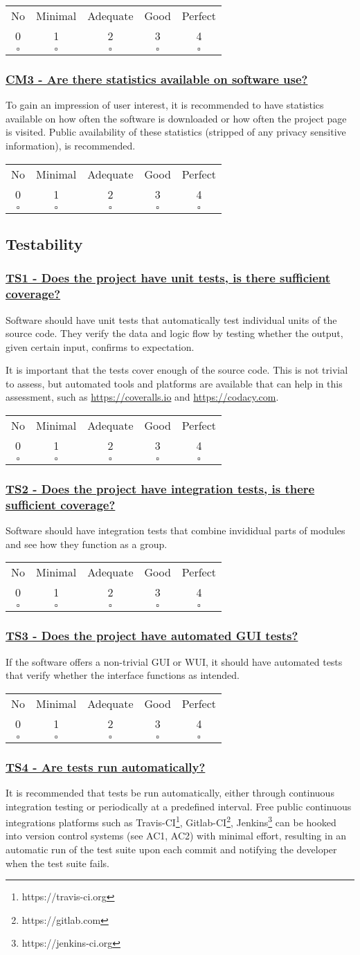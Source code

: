 \documentclass[a4paper,11pt]{article}
\newcommand{\criterion}[2]{\subsubsection*{\underline{#1 - #2}}\label{id:#1}}
\newcommand\CheckTable{%
  \begin{tabular}{ccccc}
    No & Minimal & Adequate & Good & Perfect \\
    0 & 1 & 2 & 3 & 4 \\
    \hline
    $\square$ & $\square$ & $\square$ & $\square$ & $\square$ \\
  \end{tabular}%
}
\begin{document}
\CheckTable

\newcommand{\cmThreeID}{CM3}
\newcommand{\cmThreeText}{Are there statistics available on software use?}
\criterion{\cmThreeID}{\cmThreeText}

To gain an impression of user interest, it is recommended to have statistics
available on how often the software is downloaded or how often the project page
is visited. Public availability of these statistics (stripped of any privacy
sensitive information), is recommended.

\CheckTable

\subsection{Testability}\label{sec:tes}

\newcommand{\tsOneID}{TS1}
\newcommand{\tsOneText}{Does the project have unit tests, is there sufficient coverage?}
\criterion{\tsOneID}{\tsOneText}

Software should have unit tests that automatically test individual units of the
source code. They verify the data and logic flow by testing whether the output,
given certain input, confirms to expectation.

It is important that the tests cover enough of the source code. This is not
trivial to assess, but automated tools
and platforms are available that can help in this assessment, such as
\url{https://coveralls.io} and \url{https://codacy.com}.

\CheckTable

\newcommand{\tsTwoID}{TS2}
\newcommand{\tsTwoText}{Does the project have integration tests, is there sufficient coverage?}
\criterion{\tsTwoID}{\tsTwoText}

Software should have integration tests that combine invididual parts of modules and see how they function
as a group.

\CheckTable

\newcommand{\tsThreeID}{TS3}
\newcommand{\tsThreeText}{Does the project have automated GUI tests?}
\criterion{\tsThreeID}{\tsThreeText}

If the software offers a non-trivial GUI or WUI, it should have automated tests
that verify whether the interface functions as intended.

\CheckTable

\newcommand{\tsFourID}{TS4}
\newcommand{\tsFourText}{Are tests run automatically?}
\criterion{\tsFourID}{\tsFourText}

It is recommended that tests be run automatically, either through continuous
integration testing or periodically at a predefined interval. Free public
continuous integrations platforms such as
Travis-CI\footnote{https://travis-ci.org},
Gitlab-CI\footnote{https://gitlab.com},
Jenkins\footnote{https://jenkins-ci.org} can be hooked into version control
systems (see AC1, AC2) with minimal effort, resulting in an automatic run of the test suite
upon each commit and notifying the developer when the test suite fails.
\end{document}
